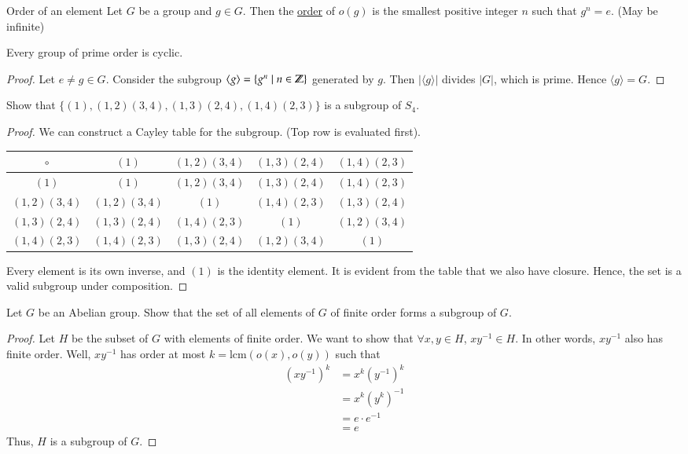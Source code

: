 \begin{defn}{Order of an element}
Let $G$ be a group and $g\in G$. Then the \ul{order} of $o(g)$ is the smallest positive integer $n$ such that $g^n=e$. (May be infinite)
\end{defn}

\begin{proposition}
	Every group of prime order is cyclic. 
\end{proposition}
\begin{proof}
Let $e\neq g\in G$. Consider the subgroup $\langle g \rangle =\{g^n\mid n\in \mathbb{Z}\}$ generated by $g$. Then $|\langle g \rangle|$ divides $|G|$, which is prime. Hence $\langle g \rangle = G$. 
\end{proof}

Show that $\{(1), (1, 2)(3, 4), (1, 3)(2, 4), (1, 4)(2, 3)\}$ is a subgroup of $S_4$. 

\begin{proof}
We can construct a Cayley table for the subgroup. (Top row is evaluated first). 

\begin{center}
\begin{tabular}{c|cccc}
$\circ$        & $(1)$          & $(1, 2)(3, 4)$ & $(1, 3)(2, 4)$ & $(1, 4)(2, 3)$ \\ \hline
$(1)$          & $(1)$          & $(1, 2)(3, 4)$ & $(1, 3)(2, 4)$ & $(1, 4)(2, 3)$ \\
$(1, 2)(3, 4)$ & $(1, 2)(3, 4)$ & $(1)$          & $(1, 4)(2, 3)$ & $(1, 3)(2, 4)$ \\
$(1, 3)(2, 4)$ & $(1, 3)(2, 4)$ & $(1, 4)(2, 3)$ & $(1)$          & $(1, 2)(3, 4)$ \\
$(1, 4)(2, 3)$ & $(1, 4)(2, 3)$ & $(1, 3)(2, 4)$ & $(1, 2)(3, 4)$ & $(1)$         
\end{tabular}
\end{center}

Every element is its own inverse, and $(1)$ is the identity element. It is evident from the table that we also have closure. Hence, the set is a valid subgroup under composition. 
\end{proof}

Let $G$ be an Abelian group. Show that the set of all elements of $G$ of finite order forms a subgroup of $G$. 

\begin{proof}
Let $H$ be the subset of $G$ with elements of finite order. We want to show that $\forall x, y\in H$, $xy^{-1}\in H$. In other words, $xy^{-1}$ also has finite order. Well, $xy^{-1}$ has order at most $k=\mathrm{lcm}(o(x), o(y))$ such that 
\begin{align*}
	(xy^{-1})^k &= x^k (y^{-1})^k \\
	&= x^k (y^k)^{-1} \\
	&= e\cdot e^{-1} \\
	&= e
\end{align*}
Thus, $H$ is a subgroup of $G$. 
\end{proof}

